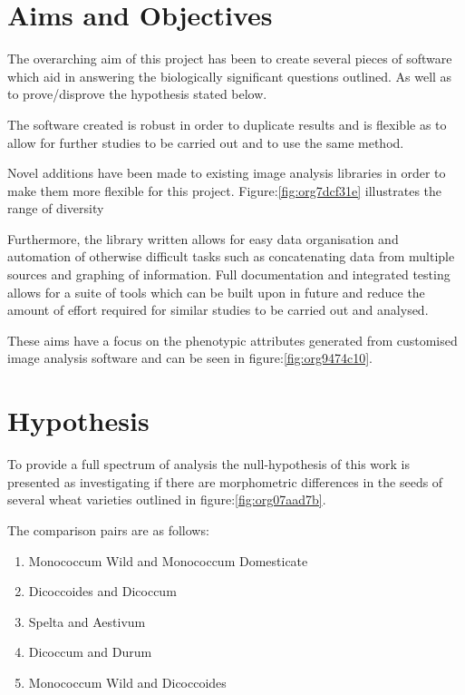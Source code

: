 \documentclass[11pt]{report}
\begin{document}
\section{Aims and Objectives}
\label{sec:org53d142c}

The overarching aim of this project has been to create several pieces of software which aid in answering the biologically significant questions outlined. As well as to prove/disprove the hypothesis stated below.

The software created is robust in order to duplicate results and is flexible as to allow for further studies to be carried out and to use the same method.

Novel additions have been made to existing image analysis libraries in order to make them more flexible for this project. Figure:\ref{fig:org7dcf31e} illustrates the range of diversity

Furthermore, the library written allows for easy data organisation and automation of otherwise difficult tasks such as concatenating data from multiple sources and graphing of information. Full documentation and integrated testing allows for a suite of tools which can be built upon in future and reduce the amount of effort required for similar studies to be carried out and analysed.

These aims have a focus on the phenotypic attributes generated from customised image analysis software \cite{Hughes2017} and can be seen in figure:\ref{fig:org9474c10}.


\section{Hypothesis}
\label{sec:orgf0afd60}
To provide a full spectrum of analysis the null-hypothesis of this work is presented as investigating if there are morphometric differences in the seeds of several wheat varieties outlined in figure:\ref{fig:org07aad7b}.

The comparison pairs are as follows:

\begin{enumerate}
\item Monococcum Wild and Monococcum Domesticate
\item Dicoccoides and Dicoccum
\item Spelta and Aestivum
\item Dicoccum and Durum
\item Monococcum Wild and Dicoccoides
\end{enumerate}
\end{document}
